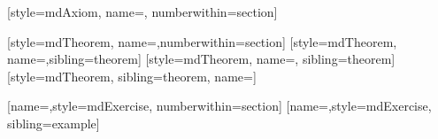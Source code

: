 
[style=mdAxiom, name={\axiomName}, numberwithin=section]

[style=mdTheorem, name={\theoremName},numberwithin=section]
[style=mdTheorem, name={\lemmaName},sibling=theorem]
[style=mdTheorem, name={\propositionName}, sibling=theorem]
[style=mdTheorem, sibling=theorem, name={\corollaryName}]

[name={\exampleName},style=mdExercise, numberwithin=section]
[name={\exerciseName},style=mdExercise, sibling=example]


\renewenvironment{proof}{\begin{Proof}}{\end{Proof}}







